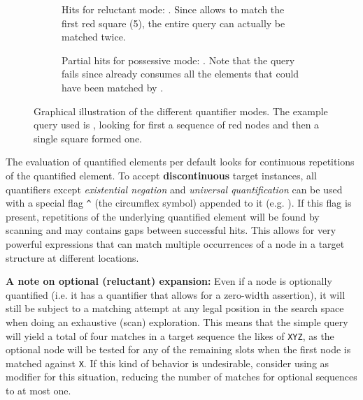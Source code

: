 \documentclass[11pt,a4paper]{report}
\begin{document}
\begin{figure}[!htb]
\begin{subfigure}{.8\textwidth}
		\caption{Hits for reluctant mode: . Since  allows  to match the first red square (5), the entire query can actually be matched twice.}
		\label{fig:reluctant-quantifier}
	\end{subfigure}
	\par\bigskip %
	\begin{subfigure}{.8\textwidth}\centering
		\caption{Partial hits for possessive mode: . Note that the query fails since  already consumes all the elements that could have been matched by .}
		\label{fig:possessive-quantifier}
	\end{subfigure}
	
	\caption[Illustration of quantification]{Graphical illustration of the different quantifier modes. The example query used is , looking for first a sequence of red nodes and then a single square formed one.}
	\label{fig:quantifier-examples}
\end{figure}

The evaluation of quantified elements per default looks for continuous repetitions of the quantified element.
To accept \textbf{discontinuous} target instances, all quantifiers except \textit{existential negation} and \textit{universal quantification} can be used with a special flag \texttt{\textasciicircum} (the circumflex symbol) appended to it (e.g. ).
If this flag is present, repetitions of the underlying quantified element will be found by scanning and may contains gaps between successful hits.
This allows for very powerful expressions that can match multiple occurrences of a node in a target structure at different locations.

\textbf{A note on optional (reluctant) expansion:}
Even if a node is optionally quantified (i.e. it has a quantifier that allows for a zero-width assertion), it will still be subject to a matching attempt at any legal position in the search space when doing an exhaustive (scan) exploration.
This means that the simple query \query{[][?]} will yield a total of four matches in a target sequence the likes of \texttt{XYZ}, as the optional node will be tested for any of the remaining slots when the first node is matched against \texttt{X}.
If this kind of behavior is undesirable, consider using  as modifier for this situation, reducing the number of matches for optional sequences to at most one.
\end{document}
